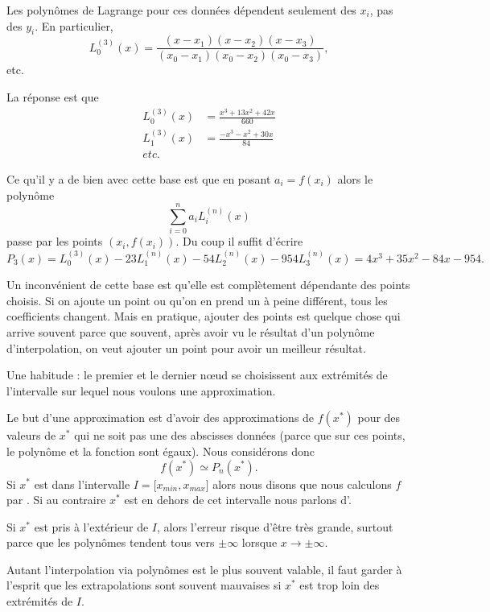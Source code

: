 Les polynômes de Lagrange pour ces données dépendent seulement des \( x_i\), pas des \( y_i\). En particulier,
\begin{equation}
	L_0^{(3)}(x)=\frac{ (x-x_1)(x-x_2)(x-x_3) }{ (x_0-x_1)(x_0-x_2)(x_0-x_3) },
\end{equation}
etc.

La réponse est que
\begin{subequations}
	\begin{align}
		L_0^{(3)}(x) & =\frac{ x^3+13x^2+42x }{ 660 } \\
		L_1^{(3)}(x) & =\frac{ -x^3-x^2+30x  }{ 84 }  \\
		etc.
	\end{align}
\end{subequations}

Ce qu'il y a de bien avec cette base est que en posant \( a_i=f(x_i)\) alors le polynôme
\begin{equation}
	\sum_{i=0}^na_iL_i^{(n)}(x)
\end{equation}
passe par les points \( (x_i,f(x_i))\). Du coup il suffit d'écrire
\begin{equation}
	P_3(x)=L_0^{(3)}(x)-23L_1^{(n)}(x)-54L_2^{(n)}(x)-954 L_3^{(n)}(x)=4x^3+35x^2-84x-954.
\end{equation}

Un inconvénient de cette base est qu'elle est complètement dépendante des points choisis. Si on ajoute un point ou qu'on en prend un à peine différent, tous les coefficients changent. Mais en pratique, ajouter des points est quelque chose qui arrive souvent parce que souvent, après avoir vu le résultat d'un polynôme d'interpolation, on veut ajouter un point pour avoir un meilleur résultat.

\begin{normaltext}
	Une habitude : le premier et le dernier nœud se choisissent aux extrémités de l'intervalle sur lequel nous voulons une approximation.

	Le but d'une approximation est d'avoir des approximations de \( f(x^*)\) pour des valeurs de \( x^*\) qui ne soit pas une des abscisses données (parce que sur ces points, le polynôme et la fonction sont égaux). Nous considérons donc
	\begin{equation}
		f(x^*)\simeq P_n(x^*).
	\end{equation}
	Si \( x^*\) est dans l'intervalle \( I= \mathopen[ x_{min} , x_{max} \mathclose]\) alors nous disons que nous calculons \( f\) par . Si au contraire \( x^*\) est en dehors de cet intervalle nous parlons d'.

	Si \( x^*\) est pris à l'extérieur de \( I\), alors l'erreur risque d'être très grande, surtout parce que les polynômes tendent tous vers \( \pm\infty\) lorsque \( x\to \pm\infty\).

	Autant l'interpolation via polynômes est le plus souvent valable, il faut garder à l'esprit que les extrapolations sont souvent mauvaises si \( x^*\) est trop loin des extrémités de \( I\).
\end{normaltext}


